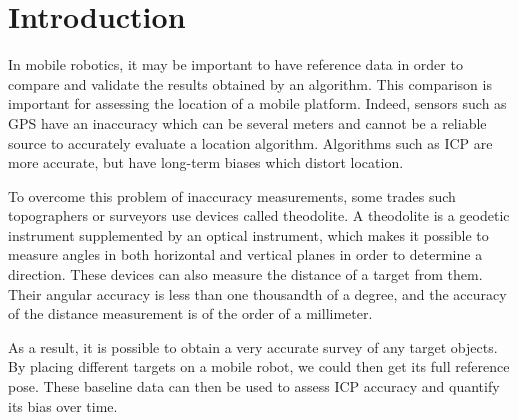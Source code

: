 \documentclass[10pt,letterpaper,oneside]{article}
\begin{document}
\makeCustomTitle
\thispagestyle{titlePage}

\section{Introduction}

In mobile robotics, it may be important to have reference data in order to compare and validate the results obtained by an algorithm.
This comparison is important for assessing the location of a mobile platform.
Indeed, sensors such as \ac{GPS} have an inaccuracy which can be several meters and cannot be a reliable source to accurately evaluate a location algorithm.
Algorithms such as \ac{ICP} are more accurate, but have long-term biases which distort location.

To overcome this problem of inaccuracy measurements, some trades such topographers or surveyors use devices called theodolite.
A theodolite is a geodetic instrument supplemented by an optical instrument, which makes it possible to measure angles in both horizontal and vertical planes in order to determine a direction.
These devices can also measure the distance of a target from them.
Their angular accuracy is less than one thousandth of a degree, and the accuracy of the distance measurement is of the order of a millimeter.

As a result, it is possible to obtain a very accurate survey of any target objects.
By placing different targets on a mobile robot, we could then get its full reference pose.
These baseline data can then be used to assess \ac{ICP} accuracy and quantify its bias over time.

%
%
\end{document}
